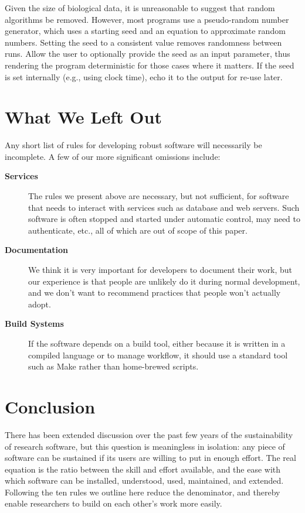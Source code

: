 \documentclass[10pt,letterpaper]{article}
\begin{document}
Given the size of biological data, it is unreasonable to suggest that
random algorithms be removed. However, most programs use a pseudo-random
number generator, which uses a starting seed and an equation to
approximate random numbers. Setting the seed to a consistent value
removes randomness between runs. Allow the user to optionally provide
the seed as an input parameter, thus rendering the program deterministic
for those cases where it matters. If the seed is set internally (e.g.,
using clock time), echo it to the output for re-use later.

\section*{What We Left Out}

Any short list of rules for developing robust software will
necessarily be incomplete.  A few of our more significant omissions
include:

\begin{description}

\item[\textbf{Services}] The rules we present above are necessary, but
  not sufficient, for software that needs to interact with services
  such as database and web servers.  Such software is often stopped
  and started under automatic control, may need to authenticate, etc.,
  all of which are out of scope of this paper.

\item[\textbf{Documentation}] We think it is very important for
  developers to document their work, but our experience is that people
  are unlikely do it during normal development, and we don't want to
  recommend practices that people won't actually adopt.

\item[\textbf{Build Systems}] If the software depends on a build tool,
  either because it is written in a compiled language or to manage
  workflow, it should use a standard tool such as Make rather than
  home-brewed scripts.

\end{description}

\section*{Conclusion}

There has been extended discussion over the past few years of the
sustainability of research software, but this question is meaningless
in isolation: any piece of software can be sustained if its users are
willing to put in enough effort.  The real equation is the ratio
between the skill and effort available, and the ease with which
software can be installed, understood, used, maintained, and extended.
Following the ten rules we outline here reduce the denominator, and
thereby enable researchers to build on each other's work more easily.


\end{document}
